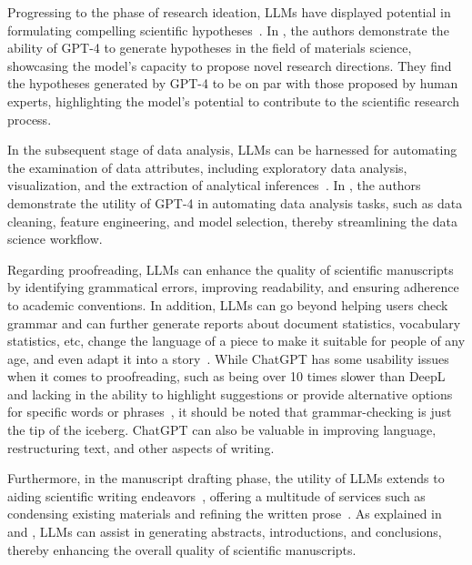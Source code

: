 Progressing to the phase of research ideation, LLMs have displayed potential in formulating compelling scientific hypotheses~\cite{park2023chatgpt}.
In \textcite{park2023chatgpt}, the authors demonstrate the ability of GPT-4 to generate hypotheses in the field of materials science, showcasing the model's capacity to propose novel research directions.
They find the hypotheses generated by GPT-4 to be on par with those proposed by human experts, highlighting the model's potential to contribute to the scientific research process.

In the subsequent stage of data analysis, LLMs can be harnessed for automating the examination of data attributes, including exploratory data analysis, visualization, and the extraction of analytical inferences~\cite{cheng2023gpt4dataanalyst}.
In \textcite{hassan2023chatgptdatascientist}, the authors demonstrate the utility of GPT-4 in automating data analysis tasks, such as data cleaning, feature engineering, and model selection, thereby streamlining the data science workflow.

Regarding proofreading, LLMs can enhance the quality of scientific manuscripts by identifying grammatical errors, improving readability, and ensuring adherence to academic conventions.
In addition, LLMs can go beyond helping users check grammar and can further generate reports about document statistics, vocabulary statistics, etc, change the language of a piece to make it suitable for people of any age, and even adapt it into a story~\cite{kim2022replacegrammarly}.
While ChatGPT has some usability issues when it comes to proofreading, such as being over 10 times slower than DeepL and lacking in the ability to highlight suggestions or provide alternative options for specific words or phrases~\cite{maximov2023englishgrammar}, it should be noted that grammar-checking is just the tip of the iceberg.
ChatGPT can also be valuable in improving language, restructuring text, and other aspects of writing.

Furthermore, in the manuscript drafting phase, the utility of LLMs extends to aiding scientific writing endeavors~\cite{alkaissi2023artificialhallucinations, azaria2023chatgptexperts}, offering a multitude of services such as condensing existing materials and refining the written prose~\cite{buruk2023academicwriting}.
As explained in \textcite{buruk2023academicwriting} and \textcite{alkaissi2023artificialhallucinations}, LLMs can assist in generating abstracts, introductions, and conclusions, thereby enhancing the overall quality of scientific manuscripts.

